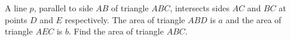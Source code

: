 A line $p$, parallel to side $AB$ of triangle $ABC$, intersects sides $AC$ and $BC$ at points $D$ and $E$ respectively. The area of triangle $ABD$ is $a$ and the area of triangle $AEC$ is $b$. Find the area of triangle $ABC$.
